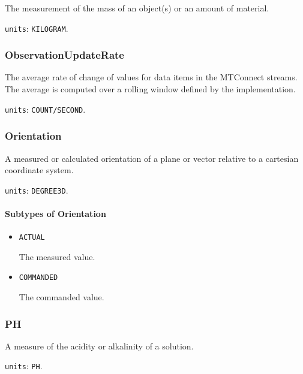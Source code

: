 The measurement of the mass of an object(s) or an amount of material.


\texttt{units}: \texttt{KILOGRAM}.


\subsubsection{ObservationUpdateRate}
\label{sec:ObservationUpdateRate}



The average rate of change of values for data items in the MTConnect streams. The average is computed over a rolling window defined by the implementation.


\texttt{units}: \texttt{COUNT/SECOND}.


\subsubsection{Orientation}
\label{sec:Orientation}



A measured or calculated orientation of a plane or vector relative to a cartesian coordinate system.


\texttt{units}: \texttt{DEGREE\textunderscore 3D}.

\paragraph{Subtypes of Orientation}\mbox{}
\label{sec:Subtypes of Orientation}

\begin{itemize}

\item \texttt{ACTUAL}


The measured value.

\item \texttt{COMMANDED}


The commanded value.


\end{itemize}





\subsubsection{PH}
\label{sec:PH}



A measure of the acidity or alkalinity of a solution.


\texttt{units}: \texttt{PH}.


